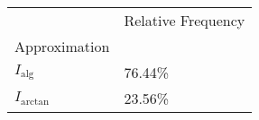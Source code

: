 \begin{tabular}{ll}
 & Relative Frequency \\
Approximation &  \\
$I_\text{alg}$ & 76.44\% \\
\cline{1-2}
$I_\text{arctan}$ & 23.56\% \\
\cline{1-2}
\end{tabular}
